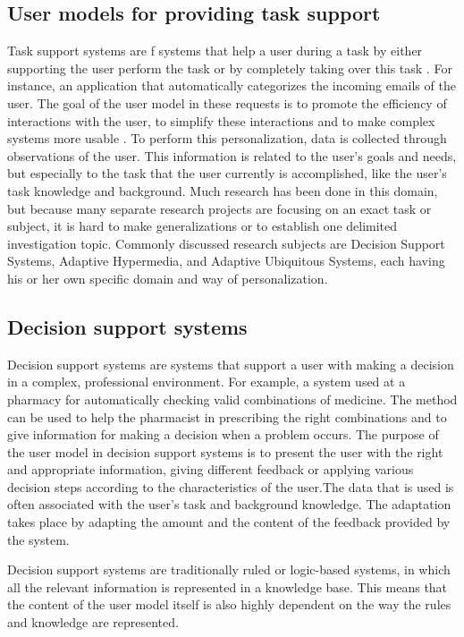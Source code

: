 \subsection{User models for providing task support}

Task support systems are f systems that help a user during a task by either
supporting the user perform the task or by completely taking over this task
\cite{brun2010compass}. For instance,  an application that
automatically categorizes the incoming emails of the user. The goal of the user
model in these requests is to promote the efficiency of interactions with the
user, to simplify these interactions and to make complex systems more usable
\cite{razmerita2009user}\cite{fischer2001user}.
To perform this personalization, data is
collected through observations of the user. This information is related to the
user’s goals and needs, but especially to the task that the user currently is
accomplished, like the user’s task knowledge and background. Much research has
been done in this domain, but because many separate research projects are
focusing on an exact task or subject, it is hard to make
generalizations or to establish one delimited investigation topic. Commonly
discussed research subjects are Decision Support Systems,  Adaptive Hypermedia,
and Adaptive Ubiquitous Systems, each having his or her own specific domain and
way of personalization.

\subsection{Decision support systems}

Decision support systems are systems that support a user with making a decision
in a complex, professional environment. For example,  a
system used at a pharmacy for automatically checking valid combinations of
medicine. The method can be used to help the pharmacist in prescribing the right
combinations and to give information for making a decision when a problem
occurs. The purpose of the user model in decision support systems is to present
the user with the right and appropriate information, giving different feedback
or applying various decision steps according to the characteristics of the
user.The data that is used is often associated with the user’s task and
background knowledge. The adaptation takes place by adapting the amount and
the content of the feedback provided by the system.


Decision support systems are traditionally ruled or logic-based systems, in
which all the relevant information is represented in a knowledge base. This
means that the content of the user model itself is also highly dependent on the
way the rules and knowledge are represented.


